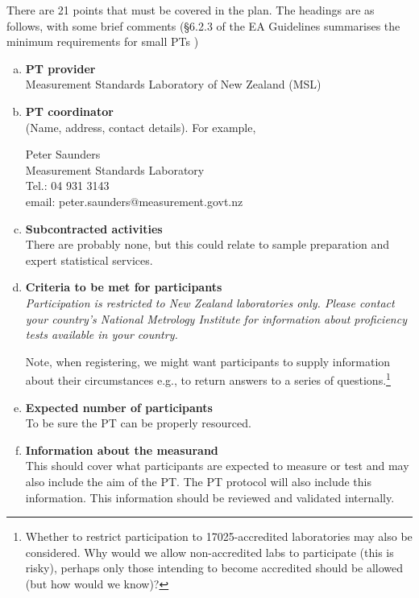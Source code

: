 There are 21 points that must be covered in the plan. The headings are as follows, with some brief comments (\S6.2.3 of the EA Guidelines summarises the minimum requirements for small PTs \cite{EA-4/21}) 

\begin{enumerate}[a)]
\item	\textbf{PT provider} \\
Measurement Standards Laboratory of New Zealand (MSL)

\item	\textbf{PT coordinator} \\
(Name, address, contact details). For example,

Peter Saunders\\
Measurement Standards Laboratory\\
Tel.: 04 931 3143\\
email: peter.saunders@measurement.govt.nz

\item	\textbf{Subcontracted activities} \\
There are probably none, but this could relate to sample preparation and expert statistical services.

\item	\textbf{Criteria to be met for participants} \\

\textit{Participation is restricted to New Zealand laboratories only.  Please contact your country's National Metrology Institute for information about proficiency tests available in your country.}

\vspace{\baselineskip}
Note, when registering, we might want participants to supply information about their circumstances  e.g., to return answers to a series of questions.\footnote{Whether to restrict participation to 17025-accredited laboratories may also be considered. Why would we allow non-accredited labs to participate (this is risky), perhaps only those intending to become accredited should be allowed (but how would we know)?}

\item	\textbf{Expected number of participants} \\
To be sure the PT can be properly resourced. 

\item	\textbf{Information about the measurand} \\ \label{l:measurands}%
This should cover what participants are expected to measure or test and may also include the aim of the PT. The PT protocol will also include this information.  This information should be reviewed and validated internally.


\end{enumerate}

